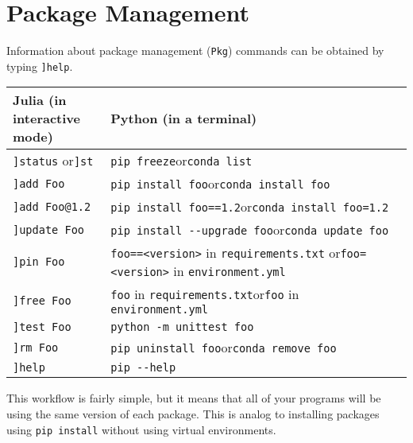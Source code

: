 \documentclass[11pt]{article}
\begin{document}
    \hypertarget{package-management}{%
\section{Package Management}\label{package-management}}

    Information about package management (\texttt{Pkg}) commands can be
obtained by typing \texttt{{]}help}.

    \begin{longtable}[]{@{}
  >{\raggedright\arraybackslash}p{}
  >{\raggedright\arraybackslash}p{}@{}}
\toprule
Julia (in interactive mode) & Python (in a terminal) \\
\midrule
\endhead
\texttt{{]}status} or\texttt{{]}st} &
\texttt{pip\ freeze}or\texttt{conda\ list} \\
\texttt{{]}add\ Foo} &
\texttt{pip\ install\ foo}or\texttt{conda\ install\ foo} \\
\texttt{{]}add\ Foo@1.2} &
\texttt{pip\ install\ foo==1.2}or\texttt{conda\ install\ foo=1.2} \\
\texttt{{]}update\ Foo} &
\texttt{pip\ install\ -\/-upgrade\ foo}or\texttt{conda\ update\ foo} \\
\texttt{{]}pin\ Foo} & \texttt{foo==\textless{}version\textgreater{}} in
\texttt{requirements.txt}
or\texttt{foo=\textless{}version\textgreater{}} in
\texttt{environment.yml} \\
\texttt{{]}free\ Foo} & \texttt{foo} in
\texttt{requirements.txt}or\texttt{foo} in \texttt{environment.yml} \\
\texttt{{]}test\ Foo} & \texttt{python\ -m\ unittest\ foo} \\
\texttt{{]}rm\ Foo} &
\texttt{pip\ uninstall\ foo}or\texttt{conda\ remove\ foo} \\
\texttt{{]}help} & \texttt{pip\ -\/-help} \\
\bottomrule
\end{longtable}

    This workflow is fairly simple, but it means that all of your programs
will be using the same version of each package. This is analog to
installing packages using \texttt{pip\ install} without using virtual
environments.


    
    
    
\end{document}
